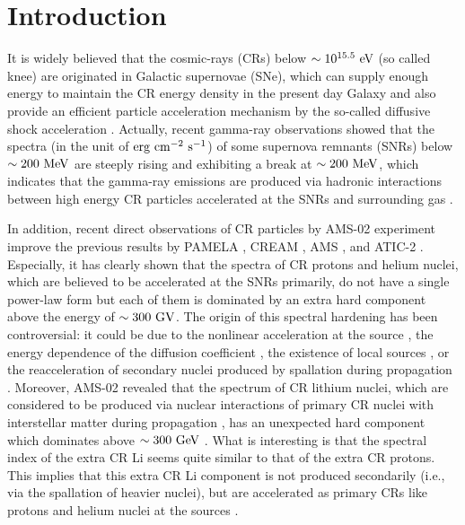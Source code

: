 \documentclass[twocolumn,showpacs,amsmath,amssymb]{revtex4-1}
\begin{document}
\section{Introduction}
It is widely believed that the cosmic-rays (CRs) below $\sim 10^{15.5}~{\rm eV}$ (so called knee) are originated in Galactic supernovae (SNe), which can supply enough energy to maintain the CR energy density in the present day Galaxy and also provide an efficient particle acceleration mechanism by the so-called diffusive shock acceleration \cite{1987PhR...154....1B}.  Actually, recent gamma-ray observations showed that the spectra (in the unit of ${\rm erg}~{\rm cm}^{-2}~{\rm s}^{-1}$) of some supernova remnants (SNRs) below $\sim 200~{\rm MeV}$ are steeply rising and exhibiting a break at $\sim 200~{\rm MeV}$, which indicates that the gamma-ray emissions are produced via hadronic interactions between high energy CR particles accelerated at the SNRs and surrounding gas \cite{2013Sci...339..807A}.

In addition, recent direct observations of CR particles by AMS-02 experiment \cite{2015PhRvL.114q1103A, 2015PhRvL.115u1101A, 2016PhRvL.117w1102A} improve the previous results by PAMELA \cite{2011Sci...332...69A}, CREAM \cite{2010ApJ...715.1400A}, AMS \cite{2000PhLB..490...27A, 2000PhLB..494..193A} , and ATIC-2 \cite{2009BRASP..73..564P}.  Especially, it has clearly shown that the spectra of CR protons and helium nuclei, which are believed to be accelerated at the SNRs primarily, do not have a single power-law form but each of them is dominated by an extra hard component above the energy of $\sim 300~{\rm GV}$.  The origin of this spectral hardening has been controversial: it could be due to the nonlinear acceleration at the source \cite{1997ApJ...487..197E, 2001RPPh...64..429M, 2013ApJ...763...47P}, the energy dependence of the diffusion coefficient \cite{2012Ap&SS.342..131T, 2017arXiv170609812G}, the existence of local sources \cite{2012MNRAS.421.1209T, 2015PhRvL.115r1103K, 2015ApJ...809L..23S, 2017arXiv171002321K}, or the reacceleration of secondary nuclei produced by spallation during propagation \cite{2017MNRAS.471.1662B}.  Moreover, AMS-02 revealed that the spectrum of CR lithium nuclei, which are considered to be produced via nuclear interactions of primary CR nuclei with interstellar matter during propagation \citep{1992ApJ...385L..13S}, has an unexpected hard component which dominates above $\sim 300~{\rm GeV}$ \cite{ting16}.  What is interesting is that the spectral index of the extra CR Li seems quite similar to that of the extra CR protons.  This implies that this extra CR Li component is not produced secondarily (i.e., via the spallation of heavier nuclei), but are accelerated as primary CRs like protons and helium nuclei at the sources \citep{footnote}.
\end{document}
